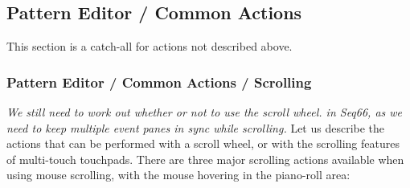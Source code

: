 \subsection{Pattern Editor / Common Actions}
\label{subsec:pattern_editor_common}

   This section is a catch-all for actions not described above.

\subsubsection{Pattern Editor / Common Actions / Scrolling}
\label{subsec:pattern_editor_scrolling}

   \textsl{We still need to work out whether or not to use the scroll wheel.
   in Seq66, as we need to keep multiple event panes in sync while scrolling.}
   Let us describe the actions that can be performed with a
   scroll wheel, or with the scrolling features of multi-touch touchpads.
   There are three major scrolling actions available when using mouse
   scrolling, with the mouse hovering in the piano-roll area:

